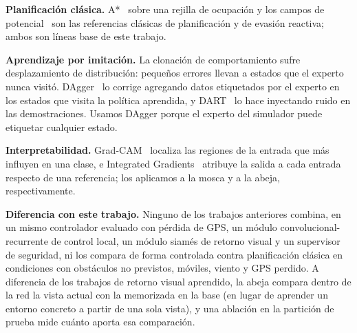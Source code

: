 \begin{table}[t]
\caption{Datos de entrenamiento de los trabajos más cercanos y de este trabajo}\label{tab:origenes}
\centering
{}
\end{table}

\textbf{Planificación clásica.} A*~\cite{hart1968} sobre una rejilla de ocupación y los
campos de potencial~\cite{khatib1986} son las referencias clásicas de planificación y de
evasión reactiva; ambos son líneas base de este trabajo.

\textbf{Aprendizaje por imitación.} La clonación de comportamiento sufre desplazamiento de
distribución: pequeños errores llevan a estados que el experto nunca visitó.
DAgger~\cite{ross2011} lo corrige agregando datos etiquetados por el experto en los estados
que visita la política aprendida, y DART~\cite{laskey2017} lo hace inyectando ruido en las
demostraciones. Usamos DAgger porque el experto del simulador puede etiquetar cualquier estado.

\textbf{Interpretabilidad.} Grad-CAM~\cite{selvaraju2017} localiza las regiones de la
entrada que más influyen en una clase, e Integrated Gradients~\cite{sundararajan2017}
atribuye la salida a cada entrada respecto de una referencia; los aplicamos a la mosca y a
la abeja, respectivamente.

\textbf{Diferencia con este trabajo.} Ninguno de los trabajos anteriores combina, en un mismo
controlador evaluado con pérdida de GPS, un módulo convolucional-recurrente de control local,
un módulo siamés de retorno visual y un supervisor de seguridad, ni los compara de forma
controlada contra planificación clásica en condiciones con obstáculos no previstos, móviles,
viento y GPS perdido. A diferencia de los trabajos de retorno visual aprendido, la abeja
compara dentro de la red la vista actual con la memorizada en la base (en lugar de aprender
un entorno concreto a partir de una sola vista), y una ablación en la partición de prueba
mide cuánto aporta esa comparación.
